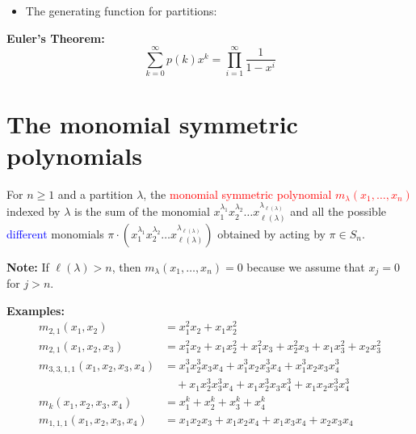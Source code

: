 \documentclass[12pt]{memoir}
\begin{document}
\begin{itemize}[label=$\diamond$]
    \item The generating function for partitions:
\end{itemize}

\begin{ptcb}
\textbf{Euler's Theorem:} 
\[
\sum_{k=0}^\infty p(k) x^k = \prod_{i=1}^\infty \frac{1}{1 - x^i}
\]
\end{ptcb}

\newpage

\section{The monomial symmetric polynomials}

\begin{ptcb}
\begin{Def}
For $n \ge 1$ and a partition $\lambda$, the \textcolor{red}{monomial symmetric polynomial $m_\lambda(x_1, \dots, x_n)$} indexed by $\lambda$ is the sum of the monomial $x_1^{\lambda_1} x_2^{\lambda_2} \dots x_{\ell(\lambda)}^{\lambda_{\ell(\lambda)}}$ and all the possible \textcolor{blue}{different} monomials $\pi \cdot (x_1^{\lambda_1} x_2^{\lambda_2} \dots x_{\ell(\lambda)}^{\lambda_{\ell(\lambda)}})$ obtained by acting by $\pi \in S_n$.

\textbf{Note:} If $\ell(\lambda) > n$, then $m_\lambda(x_1, \dots, x_n) = 0$ because we assume that $x_j = 0$ for $j > n$.
\end{Def}
\end{ptcb}

\textcolor{verdeUCR}{\textbf{Examples:}}
\begin{align*}
    m_{2,1}(x_1, x_2) &= x_1^2 x_2 + x_1 x_2^2\\[0.5em]
    m_{2,1}(x_1, x_2, x_3) &= x_1^2 x_2 + x_1 x_2^2 + x_1^2 x_3 + x_2^2 x_3 + x_1 x_3^2 + x_2 x_3^2\\[0.5em]
    m_{3,3,1,1}(x_1, x_2, x_3, x_4) &= x_1^3 x_2^3 x_3 x_4 + x_1^3 x_2 x_3^3 x_4 + x_1^3 x_2 x_3 x_4^3\\
    &\quad + x_1 x_2^3 x_3^3 x_4 + x_1 x_2^3 x_3 x_4^3 + x_1 x_2 x_3^3 x_4^3\\[0.5em]
    m_k(x_1, x_2, x_3, x_4) &= x_1^k + x_2^k + x_3^k + x_4^k\\[0.5em]
    m_{1,1,1}(x_1, x_2, x_3, x_4) &= x_1 x_2 x_3 + x_1 x_2 x_4 + x_1 x_3 x_4 + x_2 x_3 x_4
\end{align*}

\newpage
\end{document}
